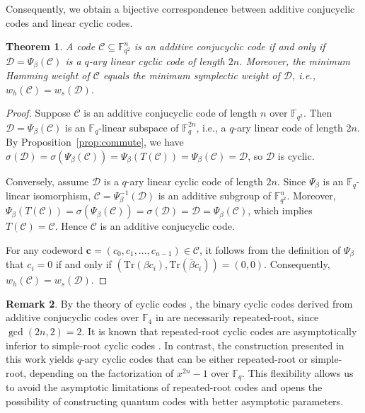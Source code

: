 \documentclass{aims}
\numberwithin{equation}{section}
\newtheorem{theorem}{Theorem}[section]
\theoremstyle{definition}
\newtheorem{remark}[theorem]{Remark}
\newcommand{\F}{\mathbb{F}}
\newcommand{\Tr}{\mathrm{Tr}}
\begin{document}
Consequently, we obtain a bijective correspondence between additive conjucyclic codes and linear cyclic codes.

\begin{theorem}\label{thm:correspondence}
	A code $\mathcal{C} \subseteq \F_{q^2}^n$ is an additive conjucyclic code if and only if $\mathcal{D} = \Psi_\beta(\mathcal{C})$ is a $q$-ary linear cyclic code of length $2n$. Moreover, the minimum Hamming weight of $\mathcal{C}$ equals the minimum symplectic weight of $\mathcal{D}$, i.e., $w_h(\mathcal{C}) = w_s(\mathcal{D})$.
\end{theorem}
\begin{proof}
	Suppose $\mathcal{C}$ is an additive conjucyclic code of length $n$ over $\F_{q^2}$. Then $\mathcal{D} = \Psi_\beta(\mathcal{C})$ is an $\F_q$-linear subspace of $\F_q^{2n}$, i.e., a $q$-ary linear code of length $2n$. By Proposition~\ref{prop:commute}, we have $\sigma(\mathcal{D}) = \sigma(\Psi_\beta(\mathcal{C})) = \Psi_\beta(T(\mathcal{C})) = \Psi_\beta(\mathcal{C}) = \mathcal{D}$, so $\mathcal{D}$ is cyclic.
	
	Conversely, assume $\mathcal{D}$ is a $q$-ary linear cyclic code of length $2n$. Since $\Psi_\beta$ is an $\F_q$-linear isomorphism, $\mathcal{C} = \Psi_\beta^{-1}(\mathcal{D})$ is an additive subgroup of $\F_{q^2}^n$. Moreover, $\Psi_\beta(T(\mathcal{C})) = \sigma(\Psi_\beta(\mathcal{C})) = \sigma(\mathcal{D}) = \mathcal{D} = \Psi_\beta(\mathcal{C})$, which implies $T(\mathcal{C}) = \mathcal{C}$. Hence $\mathcal{C}$ is an additive conjucyclic code.
	
	For any codeword $\mathbf{c} = (c_0, c_1, \ldots, c_{n-1}) \in \mathcal{C}$, it follows from the definition of $\Psi_\beta$ that $c_i = 0$ if and only if $(\Tr(\beta c_i), \Tr(\bar{\beta} c_i)) = (0,0)$. Consequently, $w_h(\mathcal{C}) = w_s(\mathcal{D})$.
\end{proof}

\begin{remark}
	By the theory of cyclic codes \cite{huffman2003}, the binary cyclic codes derived from additive conjucyclic codes over $\F_4$ in \cite{abualrub2020} are necessarily repeated-root, since $\gcd(2n,2)=2$. It is known that repeated-root cyclic codes are asymptotically inferior to simple-root cyclic codes \cite{castagnoli1991}. In contrast, the construction presented in this work yields $q$-ary cyclic codes that can be either repeated-root or simple-root, depending on the factorization of $x^{2n}-1$ over $\F_q$. This flexibility allows us to avoid the asymptotic limitations of repeated-root codes and opens the possibility of constructing quantum codes with better asymptotic parameters.
\end{remark}
\end{document}
